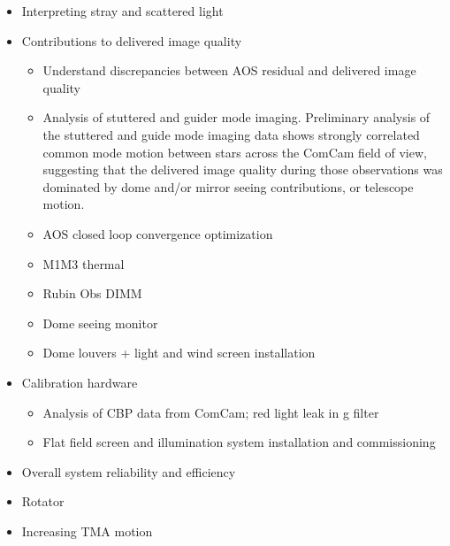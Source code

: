 \begin{itemize}
    \item Interpreting stray and scattered light
    \item Contributions to delivered image quality
    \begin{itemize}
        \item Understand discrepancies between AOS residual and delivered image quality
        \item Analysis of stuttered and guider mode imaging. Preliminary analysis of the stuttered and guide mode imaging data shows strongly correlated common mode motion between stars across the ComCam field of view, suggesting that the delivered image quality during those observations was dominated by dome and/or mirror seeing contributions, or telescope motion.
        \item AOS closed loop convergence optimization
        \item M1M3 thermal
        \item Rubin Obs DIMM
        \item Dome seeing monitor
        \item Dome louvers + light and wind screen installation
    \end{itemize}
    \item Calibration hardware
    \begin{itemize}
        \item Analysis of CBP data from ComCam; red light leak in g filter
        \item Flat field screen and illumination system installation and commissioning
    \end{itemize}
    \item Overall system reliability and efficiency
    \item Rotator
    \item Increasing TMA motion
\end{itemize}